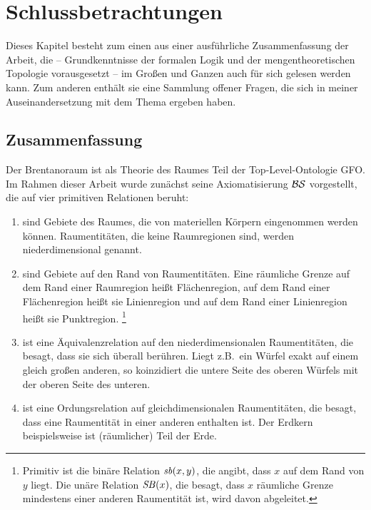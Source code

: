 \chapter{Schlussbetrachtungen}\label{chap:diskussion}
    Dieses Kapitel besteht zum einen aus einer ausführliche Zusammenfassung der Arbeit, die -- Grundkenntnisse der formalen Logik und der mengentheoretischen Topologie vorausgesetzt -- im Großen und Ganzen auch für sich gelesen werden kann.
    Zum anderen enthält sie eine Sammlung offener Fragen, die sich in meiner Auseinandersetzung mit dem Thema ergeben haben.
    
    \section{Zusammenfassung}
    Der
    Brentanoraum ist als Theorie des Raumes Teil der Top-Level-Ontologie GFO.
    Im Rahmen dieser Arbeit wurde zunächst seine Axiomatisierung $\mathcal{BS}$ vorgestellt,
    die auf vier primitiven Relationen beruht:
    \begin{enumerate}
        \item {} 
            sind Gebiete des Raumes, die von materiellen Körpern eingenommen werden können.
            Raumentitäten, die keine Raumregionen sind, werden niederdimensional genannt.
        \item {} 
            sind Gebiete auf den Rand von Raumentitäten. 
            Eine räumliche Grenze auf dem Rand einer Raumregion heißt Flächenregion, auf dem Rand einer Flächenregion heißt sie Linienregion und auf dem Rand einer Linienregion heißt sie Punktregion.%
            \footnote{
                Primitiv ist die binäre Relation $\mathit{sb}(x,y)$, die angibt, dass $x$ auf dem Rand von $y$ liegt.
                Die unäre Relation $\mathit{S\hspace*{-0.25ex}B}(x)$, die besagt, dass $x$ räumliche Grenze mindestens einer anderen Raumentität ist, wird davon abgeleitet.
            }
        \item {}
            ist eine Äquivalenzrelation auf den niederdimensionalen Raumentitäten, die besagt, dass sie sich überall berühren.
            Liegt z.B.\ ein Würfel exakt auf einem gleich großen anderen, so koinzidiert die untere Seite des oberen Würfels mit der oberen Seite des unteren.
        \item {}
            ist eine Ordungsrelation auf gleichdimensionalen Raumentitäten, die besagt, dass eine Raumentität in einer anderen enthalten ist.
            Der Erdkern beispielsweise ist (räumlicher) Teil der Erde.
    \end{enumerate}

